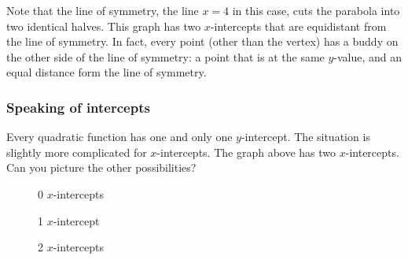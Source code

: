 Note that the line of symmetry, the line $x=4$ in this case, cuts the parabola into two identical halves. This graph has two $x$-intercepts that are equidistant from
the line of symmetry. In fact, every point (other than the vertex) has a buddy on the other side of the line of symmetry: a point that is at the same $y$-value, and an equal distance form the line of symmetry.

\subsubsection{Speaking of intercepts}

Every quadratic function has one and only one $y$-intercept. The situation is slightly more complicated for $x$-intercepts. The graph above has two $x$-intercepts. Can you picture the other possibilities?

\begin{figure}
\begin{minipage}{0.32\textwidth}
	\centering
	0 $x$-intercepts
\end{minipage}
%
\begin{minipage}{0.32\textwidth}
	\centering
	1 $x$-intercept
\end{minipage}
%
\begin{minipage}{0.32\textwidth}
	\centering
	2 $x$-intercepts
\end{minipage}
\end{figure}

